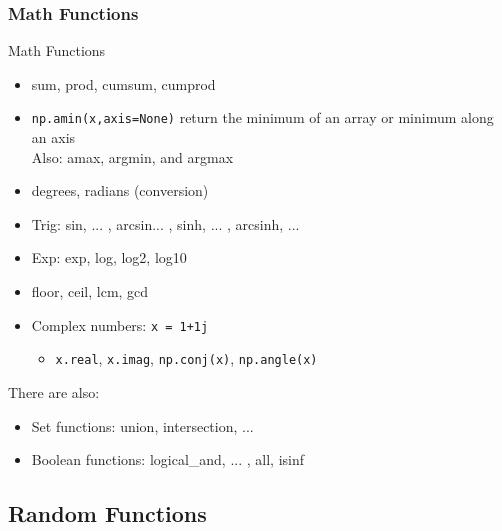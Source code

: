 \documentclass{beamer}
\newcommand{\code}[1]{\texttt{#1}}
\begin{document}
\begin{frame}	
	\frametitle{Math Functions}
	
	\begin{block}{Math Functions}
		\begin{scriptsize}
		\begin{itemize}
			\item sum, prod, cumsum, cumprod
			\item \code{np.amin(x,axis=None)} return the minimum of an array or minimum along an axis \\
					Also: amax, argmin, and argmax
			\item degrees, radians (conversion)
			\item Trig: sin, ... , arcsin... , sinh, ... , arcsinh, ...
			\item Exp: exp, log, log2, log10
			\item floor, ceil, lcm, gcd
			\item Complex numbers: \code{x = 1+1j}
			\begin{itemize}
				\scriptsize
				\item \code{x.real}, \code{x.imag}, \code{np.conj(x)}, \code{np.angle(x)}
			\end{itemize}
		\end{itemize}
		
		There are also:
		\begin{itemize}
			\item Set functions: union, intersection, ...
			\item Boolean functions: logical\_and, ... , all, isinf
		\end{itemize}
		\end{scriptsize}
	\end{block}
	
\end{frame}


\subsection{Random Functions}
\end{document}
